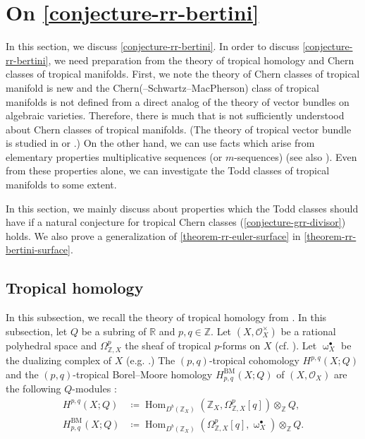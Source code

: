\documentclass[a4paper,dvipdfmx,reqno,12pt]{amsart}
\theoremstyle{definition}
\newcommand{\deq}{\coloneqq}
\newcommand{\opn}[1]{\operatorname{#1}}
\numberwithin{equation}{section}
\begin{document}
\section{On \cref{conjecture-rr-bertini}}
\label{section-on-rr-bertini}
In this section, we discuss \cref{conjecture-rr-bertini}.
In order to discuss \cref{conjecture-rr-bertini},
we need preparation from the theory of tropical homology
and Chern classes of tropical manifolds.
First, we note 
the theory of Chern classes of tropical manifold
\cite{demedrano2023chern} is new and 
the Chern(--Schwartz--MacPherson) class of
tropical manifolds is not defined from a direct analog
of the theory of vector bundles on algebraic varieties.
Therefore, there is much that is not sufficiently
understood about Chern classes of tropical manifolds.
(The theory of tropical vector bundle is studied
in \cite{MR2961320,MR4646329} or 
\cite[Theorem 1.8]{amini2020hodge}.)
On the other hand, we can use facts 
which arise from elementary properties
multiplicative sequences (or $m$-sequences)
\cite[]{MR1335917}
(see also \cite[]{MR440554}).
Even from these properties alone,
we can investigate the Todd classes of tropical manifolds
to some extent.

In this section, we mainly
discuss about properties which 
the Todd classes should have if
a natural conjecture for
tropical Chern classes
(\cref{conjecture-grr-divisor}) holds.
We also prove a generalization of 
\cref{theorem-rr-euler-surface}
in \cref{theorem-rr-bertini-surface}.

\subsection{Tropical homology}
In this subsection, we recall
the theory of tropical homology from
\cite{MR3330789,MR3894860,MR4637248}.
In this subsection, let
$Q$ be a subring of $\mathbb{R}$
and $p,q\in \mathbb{Z}$.
Let $(X,\mathcal{O}_X^{\times})$ be
a rational polyhedral space and 
$\Omega_{\mathbb{Z},X}^{p}$
the sheaf of tropical $p$-forms
on $X$ \cite[Definition 2.7]{MR4637248}
(cf. \cite[]{MR3330789}).
Let $\upomega_{X}^{\bullet}$ be
the dualizing complex of $X$
(e.g. \cite[Definition 3.1.16]{MR1299726}.)
The $(p,q)$-tropical cohomology
$H^{p,q}(X;Q)$ and 
the $(p,q)$-tropical Borel--Moore homology
$H_{p,q}^{\mathrm{BM}}(X;Q)$ of $(X,\mathcal{O}_X)$
are the following $Q$-modules
\cite[Definition 4.1 and 4.3]{MR4637248}:
\begin{align}
H^{p,q}(X;Q)&\deq \opn{Hom}_{D^{b}(\mathbb{Z}_X)}(
\mathbb{Z}_X,\Omega_{\mathbb{Z},X}^{p}[q])
\otimes_{\mathbb{Z}} Q, \\
H_{p,q}^{\mathrm{BM}}(X;Q)
&\deq \opn{Hom}_{D^{b}(\mathbb{Z}_X)}
(\Omega_{\mathbb{Z},X}^{p}[q],\upomega_{X}^{\bullet})
\otimes_{\mathbb{Z}}Q.
\end{align}
\end{document}
